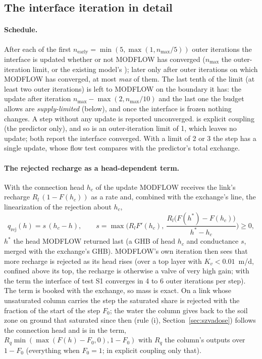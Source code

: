 \subsection{The interface iteration in detail}\label{sec:szinterface}

\paragraph{Schedule.} After each of the first $n_{\mathrm{early}}=\min(5,\max(1,n_{\max}/5))$ outer iterations the interface
is updated whether or not MODFLOW has converged ($n_{\max}$ the outer-iteration limit,  or the
existing model's ); later only after outer iterations on which MODFLOW has converged, at most
 \emph{max} of them. The last tenth of the limit (at least two outer iterations) is left to MODFLOW
on the boundary it has: the update after iteration $n_{\max}-\max(2,n_{\max}/10)$ and the last one the budget allows are
\emph{supply-limited} (below), and once the interface is frozen nothing changes. A step without any update is reported
unconverged.  is explicit coupling (the predictor only), and so is an outer-iteration limit of 1,
which leaves no update; both report the interface converged. With a limit of 2 or 3 the step has a single update, whose
flow test compares with the predictor's total exchange.

\paragraph{The rejected recharge as a head-dependent term.} With the connection head $h_c$ of the update MODFLOW receives
the link's recharge $R_l\,(1-F(h_c))$ as a rate and, combined with the exchange's line, the linearization of the rejection
about $h_c$,
\begin{equation}
q_{\mathrm{rej}}(h)=s\,(h_c-h),\qquad s=\max\Big(R_lF'(h_c),\ \frac{R_l\big(F(h^*)-F(h_c)\big)}{h^*-h_c}\Big)\ge0,
\end{equation}
$h^*$ the head MODFLOW returned last (a GHB of head $h_c$ and conductance $s$, merged with the exchange's GHB). MODFLOW's own
iteration then sees that more recharge is rejected as its head rises (over a top layer with $K_v<0.01$~m/d, confined above
its top, the recharge is otherwise a valve of very high gain; with the term the interface of test S1 converges in 4 to 6 outer
iterations per step). The term is booked with the exchange, so mass is exact. On a link
whose unsaturated column carries the step the saturated share is rejected with the fraction of the start of the step $F_0$;
the water the column gives back to the soil zone on ground that saturated since then (rule (i), Section~\ref{sec:szvadose}) follows the connection head
and is in the term, $R_q\min(\max(F(h)-F_0,0),1-F_0)$ with $R_q$ the column's outputs over $1-F_0$ (everything when $F_0=1$;
in explicit coupling only that).

